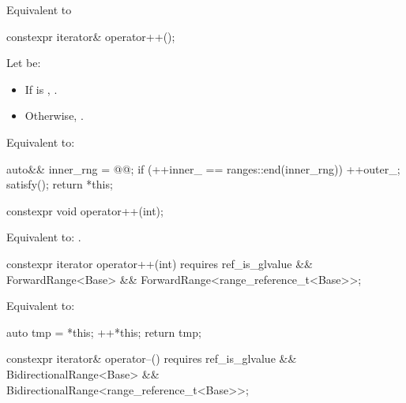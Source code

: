 \begin{itemdescr}
\pnum
\effects Equivalent to 
\end{itemdescr}

\begin{itemdecl}
constexpr iterator& operator++();
\end{itemdecl}

\begin{itemdescr}
\pnum
Let  be:
\begin{itemize}
\item If  is , .
\item Otherwise, .
\end{itemize}

\pnum
\effects Equivalent to:
\begin{codeblock}
auto&& inner_rng = @@;
if (++inner_ == ranges::end(inner_rng)) {
  ++outer_;
  satisfy();
}
return *this;
\end{codeblock}
\end{itemdescr}

\begin{itemdecl}
constexpr void operator++(int);
\end{itemdecl}

\begin{itemdescr}
\pnum
\effects Equivalent to: .
\end{itemdescr}

\begin{itemdecl}
constexpr iterator operator++(int)
  requires ref_is_glvalue && ForwardRange<Base> &&
           ForwardRange<range_reference_t<Base>>;
\end{itemdecl}

\begin{itemdescr}
\pnum
\effects Equivalent to:
\begin{codeblock}
auto tmp = *this;
++*this;
return tmp;
\end{codeblock}
\end{itemdescr}

\begin{itemdecl}
constexpr iterator& operator--()
  requires ref_is_glvalue && BidirectionalRange<Base> &&
           BidirectionalRange<range_reference_t<Base>>;
\end{itemdecl}

